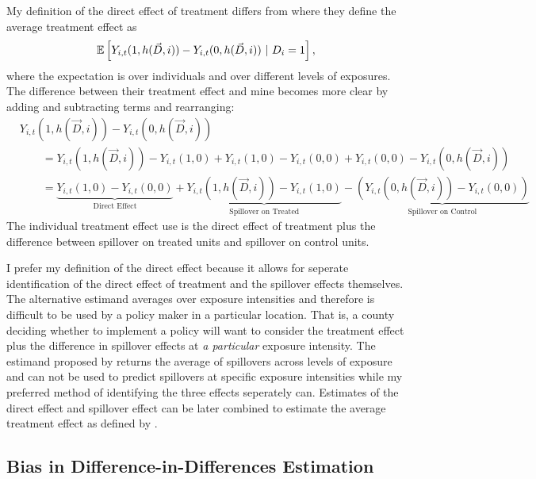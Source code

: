 \documentclass[11pt]{article}
\begin{document}
My definition of the direct effect of treatment differs from \citet{Savje_Aronow_Hudgens_2019} where they define the average treatment effect as \[ 
    \mathbb{E}\left[Y_{i,t}(1, h(\vec{D}, i)) - Y_{i,t}(0, h(\vec{D}, i)) \ \vert \ D_i = 1\right],
\] 
where the expectation is over individuals and over different levels of exposures. The difference between their treatment effect and mine becomes more clear by adding and subtracting terms and rearranging:
\begin{align*}
    &Y_{i,t}(1, h(\vec{D}, i)) - Y_{i,t}(0, h(\vec{D}, i)) \\
    &\quad\quad = Y_{i,t}(1, h(\vec{D}, i)) - Y_{i,t}(1, 0) + Y_{i,t}(1, 0) - Y_{i,t}(0,0) + Y_{i,t}(0,0) - Y_{i,t}(0, h(\vec{D}, i)) \\
    &\quad\quad = \underbrace{Y_{i,t}(1, 0) - Y_{i,t}(0,0)}_{\text{Direct Effect}} + \underbrace{Y_{i,t}(1, h(\vec{D}, i)) - Y_{i,t}(1, 0)}_{\text{Spillover on Treated}} - \underbrace{(Y_{i,t}(0, h(\vec{D}, i)) - Y_{i,t}(0,0))}_{\text{Spillover on Control}} 
\end{align*}
The individual treatment effect \citet{Savje_Aronow_Hudgens_2019} use is the direct effect of treatment plus the difference between spillover on treated units and spillover on control units. 

I prefer my definition of the direct effect because it allows for seperate identification of the direct effect of treatment and the spillover effects themselves. The alternative estimand averages over exposure intensities and therefore is difficult to be used by a policy maker in a particular location. That is, a county deciding whether to implement a policy will want to consider the treatment effect plus the difference in spillover effects at \textit{a particular} exposure intensity. The estimand proposed by \citet{Savje_Aronow_Hudgens_2019} returns the average of spillovers across levels of exposure and can not be used to predict spillovers at specific exposure intensities while my preferred method of identifying the three effects seperately can. Estimates of the direct effect and spillover effect can be later combined to estimate the average treatment effect as defined by \citet{Savje_Aronow_Hudgens_2019}.




\subsection{Bias in Difference-in-Differences Estimation}
\end{document}
